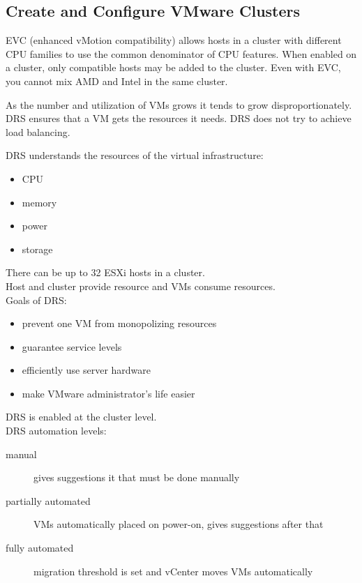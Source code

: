 \subsection{Create and Configure VMware Clusters}

EVC (enhanced vMotion compatibility) allows hosts in a cluster with different
CPU families to use the common denominator of CPU features. When enabled on a
cluster, only compatible hosts may be added to the cluster. Even with EVC,
you cannot mix AMD and Intel in the same cluster.

As the number and utilization of VMs grows it tends to grow disproportionately.
DRS ensures that a VM gets the resources it needs. DRS does not try to
achieve load balancing.

DRS understands the resources of the virtual infrastructure:

\begin{itemize}
\item CPU
\item memory
\item power
\item storage
\end{itemize}

There can be up to 32 ESXi hosts in a cluster.\\

Host and cluster provide resource and VMs consume resources.\\

Goals of DRS:

\begin{itemize}
\item prevent one VM from monopolizing resources
\item guarantee service levels
\item efficiently use server hardware
\item make VMware administrator's life easier
\end{itemize}

DRS is enabled at the cluster level.\\

DRS automation levels:

\begin{description}

\item[manual]
gives suggestions it that must be done manually

\item[partially automated]
VMs automatically placed on power-on, gives suggestions after that

\item[fully automated]
migration threshold is set and vCenter moves VMs automatically

\end{description}

